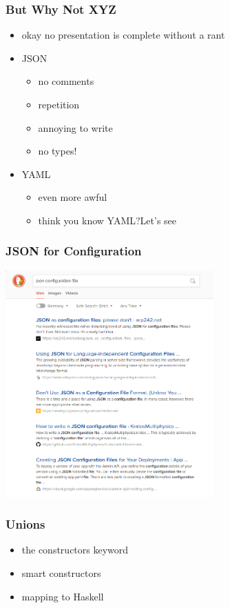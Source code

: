 \documentclass{beamer}
\begin{document}
 \begin{frame}
   \frametitle{But Why Not XYZ}
   \begin{itemize}
   \item okay no presentation is complete without a rant
   \item JSON
     \begin{itemize}
     \item no comments
     \item repetition
     \item annoying to write
     \item no types!
     \end{itemize}
   \item YAML
     \begin{itemize}
     \item even more awful
     \item think you know YAML?\@ Let's see
     \end{itemize}
   \end{itemize}
 \end{frame}

 \begin{frame}
   \frametitle{JSON for Configuration}
   \begin{center}
     \includegraphics[width=0.6\textwidth]{static-images/duckduckgo-dont-use-json.png}
   \end{center}
 \end{frame}

 \begin{frame}
   \frametitle{Unions}
   \begin{itemize}
   \item the constructors keyword
   \item smart constructors
   \item mapping to Haskell
   \end{itemize}
 \end{frame}
\end{document}
